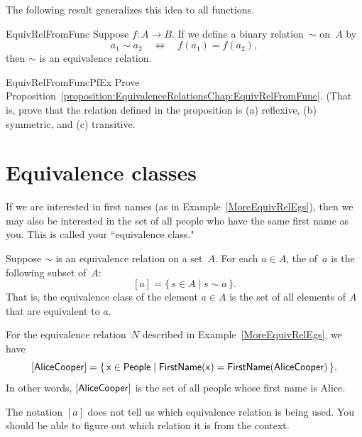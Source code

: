 The following result generalizes this idea to all functions.

\begin{prop}{EquivRelFromFunc}
Suppose $f \colon A \to B$. If we define a binary relation~$\sim$ on~$A$ by
\[ a_1 \sim a_2 \quad \iff \quad f(a_1) = f(a_2) ,\]
then $\sim$ is an equivalence relation.
\end{prop}

\begin{exercise}{EquivRelFromFuncPfEx}
Prove Proposition~\ref{proposition:EquivalenceRelationsChap:EquivRelFromFunc}. (That is, prove that the relation defined in the proposition is (a) reflexive, (b) symmetric, and (c) transitive.
\end{exercise}



 \section{Equivalence classes} \label{EquivalenceRelationsClassesSect}

If we are interested in first names (as in Example~\ref{MoreEquivRelEgs}), then we may also be interested in the set of all people who have the same first name as you. This is called your ``equivalence class."
 
 \begin{defn}\label{DefEquivRel}
 Suppose $\sim$ is an equivalence relation on a set~$A$. For each $a \in A$, the  of~$a$ is the following subset of~$A$:
 	$$ [a] = \{\, s \in A \mid s \sim a \,\} .$$
That is, the equivalence class of the element $a \in A$ is the set of all elements of $A$ that are equivalent to $a$.
\end{defn}


\begin{eg}
For the equivalence relation~$N$ described in Example~\ref{MoreEquivRelEgs}, we have
	$$ [\sf{Alice Cooper}] = \{\, x \in \sf{People} \mid \sf{FirstName}(x) = \sf{FirstName}(\sf{Alice Cooper}) \,\} .$$
In other words, $[\sf{Alice Cooper}]$ is the set of all people whose first name is Alice.
\end{eg}


\begin{warn}
The notation $[a]$ does not tell us which equivalence relation is being used. You should be able to figure out which relation it is from the context.
\end{warn}



